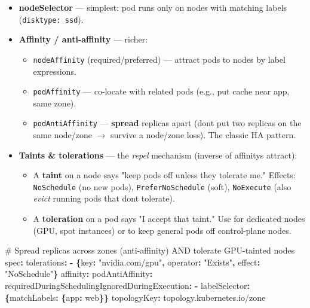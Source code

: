 \documentclass[11pt]{article}
\providecommand{\tightlist}{\setlength{\itemsep}{1pt}\setlength{\parskip}{0pt}}
\newenvironment{Shaded}{\begin{snugshade}}{\end{snugshade}}
\newcommand{\AttributeTok}[1]{\textcolor[rgb]{0.16,0.50,0.73}{#1}}
\newcommand{\CommentTok}[1]{\textcolor[rgb]{0.48,0.49,0.49}{#1}}
\newcommand{\FunctionTok}[1]{\textcolor[rgb]{0.56,0.27,0.68}{#1}}
\newcommand{\KeywordTok}[1]{\textcolor[rgb]{0.81,0.81,0.76}{\textbf{#1}}}
\newcommand{\StringTok}[1]{\textcolor[rgb]{0.96,0.31,0.31}{#1}}
\begin{document}
\begin{itemize}
\tightlist
\item
  \textbf{nodeSelector} --- simplest: pod runs only on nodes with matching labels (\texttt{disktype:\ ssd}).
\item
  \textbf{Affinity / anti-affinity} --- richer:

  \begin{itemize}
  \tightlist
  \item
    \texttt{nodeAffinity} (required/preferred) --- attract pods to nodes by label expressions.
  \item
    \texttt{podAffinity} --- co-locate with related pods (e.g., put cache near app, same zone).
  \item
    \texttt{podAntiAffinity} --- \textbf{spread} replicas apart (don\textquotesingle t put two replicas on the same node/zone \(\rightarrow\) survive a node/zone loss). The classic HA pattern.
  \end{itemize}
\item
  \textbf{Taints \& tolerations} --- the \emph{repel} mechanism (inverse of affinity\textquotesingle s attract):

  \begin{itemize}
  \tightlist
  \item
    A \textbf{taint} on a node says "keep pods off unless they tolerate me." Effects: \texttt{NoSchedule} (no new pods), \texttt{PreferNoSchedule} (soft), \texttt{NoExecute} (also \emph{evict} running pods that don\textquotesingle t tolerate).
  \item
    A \textbf{toleration} on a pod says "I accept that taint." Use for dedicated nodes (GPU, spot instances) or to keep general pods off control-plane nodes.
  \end{itemize}
\end{itemize}


\begin{Shaded}
\begin{Highlighting}[]
\CommentTok{\# Spread replicas across zones (anti{-}affinity) AND tolerate GPU{-}tainted nodes}
\FunctionTok{spec}\KeywordTok{:}
\AttributeTok{  }\FunctionTok{tolerations}\KeywordTok{:}
\AttributeTok{    }\KeywordTok{{-}}\AttributeTok{ }\KeywordTok{\{}\FunctionTok{key}\KeywordTok{:}\AttributeTok{ }\StringTok{"nvidia.com/gpu"}\KeywordTok{,}\AttributeTok{ }\FunctionTok{operator}\KeywordTok{:}\AttributeTok{ }\StringTok{"Exists"}\KeywordTok{,}\AttributeTok{ }\FunctionTok{effect}\KeywordTok{:}\AttributeTok{ }\StringTok{"NoSchedule"}\KeywordTok{\}}
\AttributeTok{  }\FunctionTok{affinity}\KeywordTok{:}
\AttributeTok{    }\FunctionTok{podAntiAffinity}\KeywordTok{:}
\AttributeTok{      }\FunctionTok{requiredDuringSchedulingIgnoredDuringExecution}\KeywordTok{:}
\AttributeTok{        }\KeywordTok{{-}}\AttributeTok{ }\FunctionTok{labelSelector}\KeywordTok{:}\AttributeTok{ }\KeywordTok{\{}\FunctionTok{matchLabels}\KeywordTok{:}\AttributeTok{ }\KeywordTok{\{}\FunctionTok{app}\KeywordTok{:}\AttributeTok{ web}\KeywordTok{\}\}}
\AttributeTok{          }\FunctionTok{topologyKey}\KeywordTok{:}\AttributeTok{ topology.kubernetes.io/zone}
\end{Highlighting}
\end{Shaded}
\end{document}
